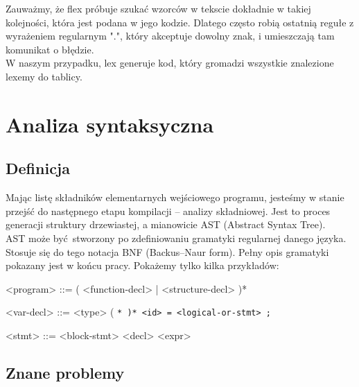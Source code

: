 \documentclass[a4paper, 12pt]{extarticle}
\newcommand{\spacing}{\vskip 0.5cm}
\begin{document}
		\spacing
		
		Zauważmy, że flex próbuje szukać wzorców w tekscie dokładnie w takiej kolejności, która jest podana w
		jego kodzie. Dlatego często robią ostatnią regułe z wyrażeniem regularnym ".", który akceptuje
		dowolny znak, i umieszczają tam komunikat o błędzie.
		\\

		W naszym przypadku, lex generuje kod, który gromadzi wszystkie znalezione lexemy do tablicy.

		\newpage

	\section{Analiza syntaksyczna}
		
		\subsection{Definicja}

			Mając listę składników elementarnych wejściowego programu, jesteśmy w stanie przejść do
			następnego etapu kompilacji -- analizy składniowej. Jest to proces generacji struktury
			drzewiastej, a mianowicie AST (Abstract Syntax Tree).
			\\

			AST może być stworzony po zdefiniowaniu gramatyki regularnej danego języka. Stosuje się
			do tego notacja BNF (Backus–Naur form). Pełny opis gramatyki pokazany jest w końcu pracy. Pokażemy
			tylko kilka przykładów:
			
			\spacing

		    \setlength{\grammarindent}{12em}

		    \begin{grammar}
		        <program> ::= ( <function-decl> | <structure-decl> )*

		        <var-decl> ::= <type> ( \tt{*} )* <id> \tt{=} <logical-or-stmt> \tt{;}

		        <stmt> ::= <block-stmt>
		        \alt <selection-stmt>
		        \alt <iteration-stmt>
		        \alt <jump-stmt>
		        \alt <assignment-stmt>
		        \alt <primary-stmt>
			\end{grammar}
			
			\spacing
			
		\subsection{Znane problemy}
\end{document}
